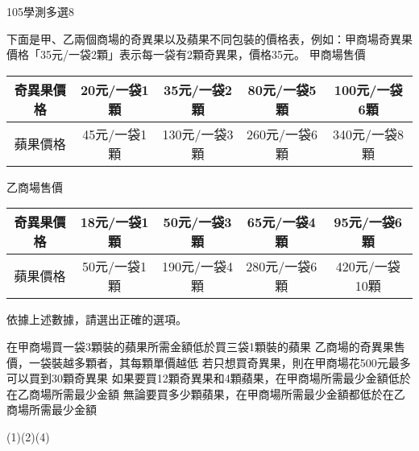     \begin{QUESTION}
        \begin{ExamInfo}{105}{學測}{多選}{8}
        \end{ExamInfo}
        \begin{ExamAnsRateInfo}{59}{77}{60}{40}
        \end{ExamAnsRateInfo}
        \begin{QBODY}
            下面是甲、乙兩個商場的奇異果以及蘋果不同包裝的價格表，例如：甲商場奇異果價格「35元/一袋2顆」表示每一袋有2顆奇異果，價格35元。
			甲商場售價
			\begin{tabular}{|c|c|c|c|c|}
			\hline
				奇異果價格	& 20元/一袋1顆	& 35元/一袋2顆	& 80元/一袋5顆	& 100元/一袋6顆 \\\hline
				蘋果價格	& 45元/一袋1顆	& 130元/一袋3顆	& 260元/一袋6顆	& 340元/一袋8顆 \\\hline
			\end{tabular}
			乙商場售價
			\begin{tabular}{|c|c|c|c|c|}
			\hline			
			奇異果價格  & 18元/一袋1顆	& 50元/一袋3顆	& 65元/一袋4顆	& 95元/一袋6顆 \\\hline
			蘋果價格	& 50元/一袋1顆	& 190元/一袋4顆	& 280元/一袋6顆	& 420元/一袋10顆\\\hline
			\end{tabular}
			依據上述數據，請選出正確的選項。
			\begin{QOPS}
				\QOP 在甲商場買一袋3顆裝的蘋果所需金額低於買三袋1顆裝的蘋果
				\QOP 乙商場的奇異果售價，一袋裝越多顆者，其每顆單價越低
				\QOP 若只想買奇異果，則在甲商場花500元最多可以買到30顆奇異果
				\QOP 如果要買12顆奇異果和4顆蘋果，在甲商場所需最少金額低於在乙商場所需最少金額
				\QOP 無論要買多少顆蘋果，在甲商場所需最少金額都低於在乙商場所需最少金額
			\end{QOPS}
        \end{QBODY}
        \begin{QFROMS}
        \end{QFROMS}
        \begin{QTAGS}\end{QTAGS}
        \begin{QANS}
            (1)(2)(4)
        \end{QANS}
        \begin{QSOLLIST}
        \end{QSOLLIST}
        \begin{QEMPTYSPACE}
        \end{QEMPTYSPACE}
    \end{QUESTION}
